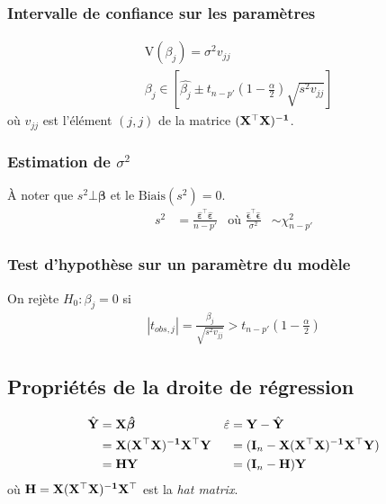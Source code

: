 \documentclass[10pt, french]{article}
\begin{document}
\begin{multicols*}{3}
\subsubsection*{Intervalle de confiance sur les paramètres}
\begin{align*}
&\text{V}(\beta_j) = \sigma^2 v_{jj} \\
&\beta_j \in \left[ \hat{\beta_j} \pm t_{n-p'} \left(1- \frac{\alpha}{2} \right) \sqrt{s^2 v_{jj}} \right]
\end{align*}
où $v_{jj}$ est l'élément $(j,j)$ de la matrice $\mathbf{(X^\top X)^{-1}}$.

\subsubsection*{Estimation de $\sigma^2$}
À noter que $s^{2}\bot \bm{\beta}$ et le $\text{Biais}(s^{2}) = 0$.\\
\begin{align*}
s^2 &= \frac{\hat{\bm{\varepsilon}}^\top \hat{\bm{\varepsilon}}}{n-p'} &\text{où } \frac{\bm{\hat\epsilon}^{\top}\bm{\hat\epsilon}}{\sigma^{2}} &\sim \chi^{2}_{n - p'}
\end{align*}

\subsubsection*{Test d'hypothèse sur un paramètre du modèle}
On rejète $H_0 : \beta_j = 0$ si
\begin{align*}
|t_{obs, j}| = \frac{\beta_j}{\sqrt{s^2 v_{jj}} } > t_{n-p'}\left(1 - \frac{\alpha}{2} \right) 
\end{align*}

\subsection*{Propriétés de la droite de régression}
\begin{align*}
\hat{\mathbf{Y}} 
	&= \mathbf{X} \bm{\hat{\beta}}  &
\hat{\varepsilon} 
	&= \mathbf{Y} - \hat{\mathbf{Y}} \\
	&= \mathbf{X(X^\top X)^{-1} X^\top Y} &
	&= (\mathbf{I}_n - \mathbf{X(X^\top X)^{-1} X^\top Y}) \\
	&= \mathbf{H Y}  &
	&= (\mathbf{I}_n - \mathbf{H})\mathbf{Y} 
\end{align*}	
où $\mathbf{H = X(X^\top X)^{-1}X^\top}$ est la \textit{hat matrix}.\\


\end{multicols*}
\end{document}
